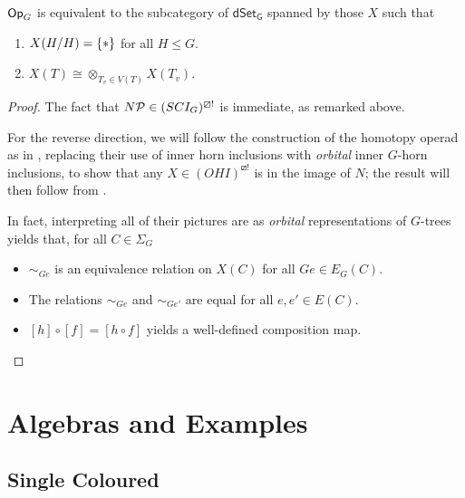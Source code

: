 \documentclass[psamsfonts,onesided,10pt
,draft
]{amsart}%
\begin{document}
\begin{proposition}
      $\Op_G$ is equivalent to the subcategory of $\mathsf{dSet_G}$ spanned by those $X$ such that
      \begin{enumerate}
      \item $X(H/H) = \set{\**}$ for all $H \leq G$.
      \item $X(T) \cong \otimes_{T_v \in V(T)}X(T_v)$. 
      \end{enumerate}
\end{proposition}
\begin{proof}
      The fact that $N\P \in (SCI_G)^{\boxslash !}$ is immediate, as remarked above.

      For the reverse direction, we will follow the construction of the homotopy operad as in \cite[\S 6]{MW08},
      replacing their use of inner horn inclusions with \textit{orbital} inner $G$-horn inclusions,
      to show that any $X \in (OHI)^{\boxslash !}$ is in the image of $N$; 
      the result will then follow from \cite[HYPER PROP]{BP18}.

      In fact, interpreting all of their pictures are as \textit{orbital} representations of $G$-trees yields that,
      for all $C \in \Sigma_G$
      \begin{itemize}
      \item $\sim_{G e}$ is an equivalence relation on $X(C)$ for all $Ge \in E_G(C)$.
      \item The relations $\sim_{G e}$ and $\sim_{G e'}$ are equal for all $e,e'\in E(C)$.
      \item $[h] \circ [f] = [h \circ f]$ yields a well-defined composition map. 
      \end{itemize}
\end{proof}



\section{Algebras and Examples}

\subsection{Single Coloured}


{}




\end{document}
